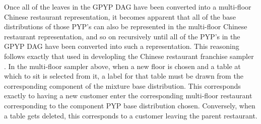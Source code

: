 \documentclass{article}
\newcommand{\comment}[1]{}
\begin{document}
{Once all of the leaves in the GPYP DAG have been converted into a multi-floor Chinese restaurant representation, it becomes apparent that all of the base distributions of those PYP's can also be represented in the multi-floor Chinese restaurant representation, and so on recursively until all of the PYP's in the GPYP DAG have been converted into such a representation.  This reasoning follows exactly that used in developling the Chinese restaurant franchise sampler \citep{TehJorBea2006}.  In the multi-floor sampler above, when a new floor is chosen and a table at which to sit is selected from it, a label for that table must be drawn from the corresponding component of the mixture base distribution.  This corresponds exactly to having a new customer enter the corresponding multi-floor restaurant corresponding to the component PYP base distribution chosen.  Conversely, when a table gets deleted, this corresponds to a customer leaving the parent restaurant.  
}
\comment{
Starting at a sink vertex (a vertex with only incoming edges) in the GPYP DAG
In the MFCRF none of the $\mathcal{G}_v$'s are represented and instead all of them are integrated out.  The MFCRP allows us to evaluate $P(x_v^{n+1} | \bz_v, \Phi_v, \bx_v, S_v)$ by marginalizing over $z_v^{n+1}$ if we can evaluate  $\mathcal{G}_w(\phi_v).$
}
\comment{from the distributions
\[P(s_v^k | S_v \backslash s_v^k, \Lambda_v)\] and  
\[P(\phi_v^k | \Phi_v \backslash \phi_v^k, \bx_v)\] }
\end{document}
